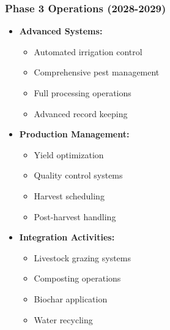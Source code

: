 \subsubsection{Phase 3 Operations (2028-2029)}
\begin{itemize}
    \item \textbf{Advanced Systems:}
    \begin{itemize}
        \item Automated irrigation control
        \item Comprehensive pest management
        \item Full processing operations
        \item Advanced record keeping
    \end{itemize}
    \item \textbf{Production Management:}
    \begin{itemize}
        \item Yield optimization
        \item Quality control systems
        \item Harvest scheduling
        \item Post-harvest handling
    \end{itemize}
    \item \textbf{Integration Activities:}
    \begin{itemize}
        \item Livestock grazing systems
        \item Composting operations
        \item Biochar application
        \item Water recycling
    \end{itemize}
\end{itemize}

